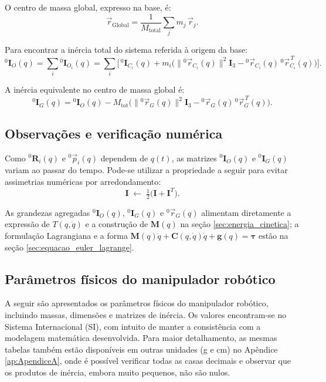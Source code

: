 O centro de massa global, expresso na base, é:
\begin{equation}
  \vec{r}_{\text{Global}} = \frac{1}{M_{\text{total}}} \sum_{j} m_j \,\vec{r}_j .
\end{equation}

Para encontrar a inércia total do sistema referida à origem da base:
\begin{equation}
{}^{0}\!\mathbf I_{O}(q)=\sum_{i} {}^{0}\!\mathbf I_{O_i}(q)
=\sum_{i}\Big[\,{}^{0}\!\mathbf I_{C_i}(q)+ m_i\big(\|{}^{0}\!\vec r_{C_i}(q)\|^2\mathbf I_3-{}^{0}\!\vec r_{C_i}(q)\,{}^{0}\!\vec r_{C_i}^{\,T}(q)\big)\Big].
\label{eq:I_total_O}
\end{equation}

A inércia equivalente no centro de massa global é:
\begin{equation}
{}^{0}\!\mathbf I_{G}(q)
= {}^{0}\!\mathbf I_{O}(q)
- M_{\mathrm{tot}}\big(\|{}^{0}\!\vec r_{G}(q)\|^2\mathbf I_3-{}^{0}\!\vec r_{G}(q)\,{}^{0}\!\vec r_{G}^{\,T}(q)\big).
\label{eq:I_total_G}
\end{equation}

\subsection{Observações e verificação numérica}
Como ${}^{0}\!\mathbf R_i(q)$ e ${}^{0}\!\vec p_i(q)$ dependem de $q(t)$, as matrizes \({}^{0}\!\mathbf I_{O}(q)\) e \({}^{0}\!\mathbf I_{G}(q)\) variam ao passar do tempo.
Pode-se utilizar a propriedade a seguir para evitar assimetrias numéricas por arredondamento:
\begin{equation}
\mathbf I \;\leftarrow\; \tfrac{1}{2}\big(\mathbf I+\mathbf I^{T}\big).
\label{eq:symmetrize}
\end{equation}

As grandezas agregadas
\({}^{0}\!\mathbf I_{O}(q)\),
\({}^{0}\!\mathbf I_{G}(q)\) e
\({}^{0}\!\vec r_{G}(q)\)
alimentam diretamente a expressão de \(T(q,\dot q)\)
e a construção de \(\mathbf M(q)\) na seção \eqref{sec:energia_cinetica};
a formulação Lagrangiana e a forma \(\mathbf M(q)\ddot q+\mathbf C(q,\dot q)\dot q+\mathbf g(q)=\boldsymbol\tau\) estão na seção \eqref{sec:equacao_euler_lagrange}. 

\subsection{Parâmetros físicos do manipulador robótico}
A seguir são apresentados os parâmetros físicos do manipulador robótico, incluindo massas, dimensões e matrizes de inércia. 
Os valores encontram-se no Sistema Internacional (SI), com intuito de manter a consistência com a modelagem matemática desenvolvida. 
Para maior detalhamento, as mesmas tabelas também estão disponíveis em outras unidades (g e cm) no Apêndice
\eqref{ap:ApendiceA},
onde é possível verificar todas as casas decimais e observar que os produtos de inércia, embora muito pequenos, não são nulos.

